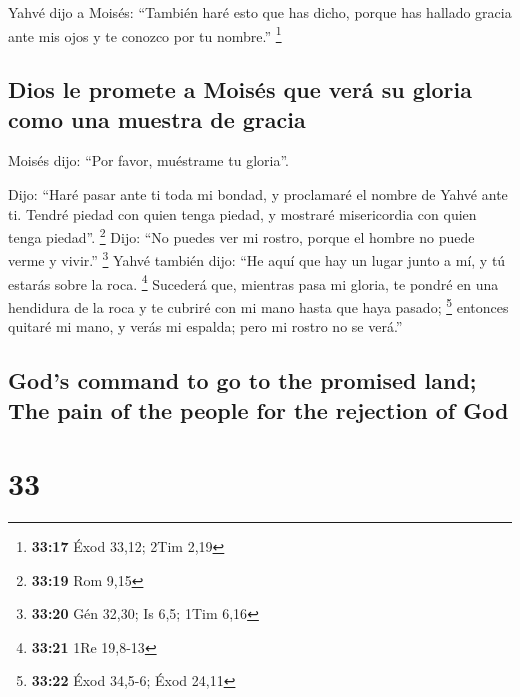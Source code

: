 \begin{paracol}{2}
 Yahvé dijo a Moisés: ``También haré esto que has dicho,
porque has hallado gracia ante mis ojos y te conozco por tu nombre.''
\footnote{\textbf{33:17} Éxod 33,12; 2Tim 2,19}

\hypertarget{dios-le-promete-a-moisuxe9s-que-veruxe1-su-gloria-como-una-muestra-de-gracia}{%
\subsection{Dios le promete a Moisés que verá su gloria como una muestra
de
gracia}\label{dios-le-promete-a-moisuxe9s-que-veruxe1-su-gloria-como-una-muestra-de-gracia}}

 Moisés dijo: ``Por favor, muéstrame tu gloria''.

 Dijo: ``Haré pasar ante ti toda mi bondad, y proclamaré
el nombre de Yahvé ante ti. Tendré piedad con quien tenga piedad, y
mostraré misericordia con quien tenga piedad''. \footnote{\textbf{33:19}
  Rom 9,15}  Dijo: ``No puedes ver mi rostro, porque el
hombre no puede verme y vivir.'' \footnote{\textbf{33:20} Gén 32,30; Is
  6,5; 1Tim 6,16}  Yahvé también dijo: ``He aquí que hay
un lugar junto a mí, y tú estarás sobre la roca. \footnote{\textbf{33:21}
  1Re 19,8-13}  Sucederá que, mientras pasa mi gloria, te
pondré en una hendidura de la roca y te cubriré con mi mano hasta que
haya pasado; \footnote{\textbf{33:22} Éxod 34,5-6; Éxod 24,11}
 entonces quitaré mi mano, y verás mi espalda; pero mi
rostro no se verá.''

\switchcolumn
\begin{otherlanguage}{english}

\hypertarget{gods-command-to-go-to-the-promised-land-the-pain-of-the-people-for-the-rejection-of-god}{%
\subsection{God's command to go to the promised land; The pain of the
people for the rejection of
God}\label{gods-command-to-go-to-the-promised-land-the-pain-of-the-people-for-the-rejection-of-god}}

\hypertarget{section-65}{%
\section{33}\label{section-65}}


\end{otherlanguage}
\end{paracol}
